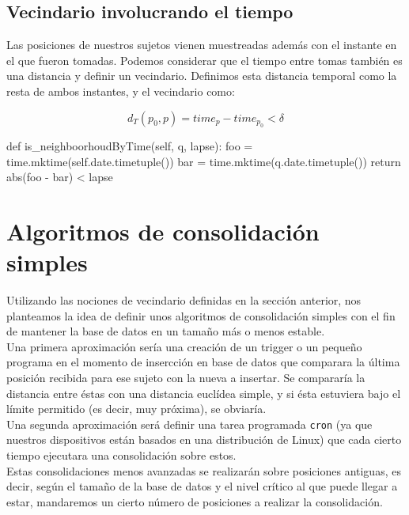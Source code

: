 \documentclass[a4paper, 12pt]{article}
\begin{document}
\subsection{Vecindario involucrando el tiempo}

Las posiciones de nuestros sujetos vienen muestreadas adem\'as con el instante en el que fueron tomadas. Podemos considerar que el tiempo entre tomas tambi\'en es una distancia y definir un vecindario. Definimos esta distancia temporal como la resta de ambos instantes, y el vecindario como:

$$ d_T(p_0, p) = time_p - time_{p_0} < \delta $$

\begin{python}
	def is_neighboorhoudByTime(self, q, lapse):
		foo = time.mktime(self.date.timetuple())
		bar = time.mktime(q.date.timetuple())
		return abs(foo - bar) < lapse
\end{python}


\pagebreak
\section{Algoritmos de consolidaci\'on simples}

Utilizando las nociones de vecindario definidas en la secci\'on anterior, nos planteamos la idea de definir unos algoritmos de consolidaci\'on simples con el fin de mantener la base de datos en un tama\~no m\'as o menos estable. \\

Una primera aproximaci\'on ser\'ia una creaci\'on de un trigger o un peque\~no programa en el momento de insercci\'on en base de datos que comparara la \'ultima posici\'on recibida para ese sujeto con la nueva a insertar. Se comparar\'ia la distancia entre \'estas con una distancia eucl\'idea simple, y si \'esta estuviera bajo el l\'imite permitido (es decir, muy pr\'oxima), se obviar\'ia. \\

Una segunda aproximaci\'on ser\'a definir una tarea programada \texttt{cron} (ya que nuestros dispositivos est\'an basados en una distribuci\'on de Linux) que cada cierto tiempo ejecutara una consolidaci\'on sobre estos. \\

Estas consolidaciones menos avanzadas se realizar\'an sobre posiciones antiguas, es decir, seg\'un el tama\~no de la base de datos y el nivel cr\'itico al que puede llegar a estar, mandaremos un cierto n\'umero de posiciones a realizar la consolidaci\'on. \\
\end{document}
